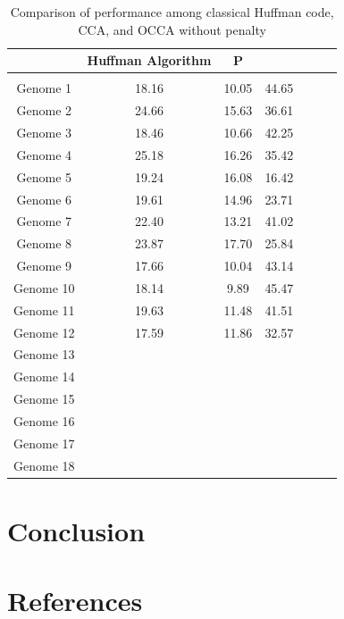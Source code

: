 \documentclass[preprint,12pt]{elsarticle}
\begin{document}
\begin{table}[h]
\renewcommand{\arraystretch}{1.1}
\small
\label{table4}
\caption{Comparison of performance among classical Huffman code, CCA, and OCCA without penalty}

\begin{tabular}{c  c c  c c  c c}
\hline
 & Huffman Algorithm & P \\\hline
\\\hline
Genome 1& 18.16 & 10.05 & 44.65 \\\hline
Genome 2& 24.66 &  15.63 & 36.61 \\\hline
Genome 3&18.46 &  10.66&  42.25\\\hline
Genome 4&25.18&16.26& 35.42\\\hline
Genome 5& 19.24& 16.08 &16.42 \\\hline
Genome 6& 19.61&14.96&23.71\\\hline
Genome 7& 22.40 &13.21&41.02\\\hline
Genome 8&23.87 & 17.70 &25.84\\\hline
Genome 9&17.66 &10.04&43.14\\\hline
Genome 10& 18.14 &9.89& 45.47 \\\hline
Genome 11&19.63&11.48&41.51 \\\hline
Genome 12& 17.59&11.86&32.57 \\\hline
Genome 13& &&\\\hline
Genome 14& && \\\hline
Genome 15& && \\\hline
Genome 16&&& \\\hline
Genome 17& && \\\hline
Genome 18& && \\\hline

\end{tabular}
\end{table}
\section{Conclusion}





\section*{References}


\end{document}
